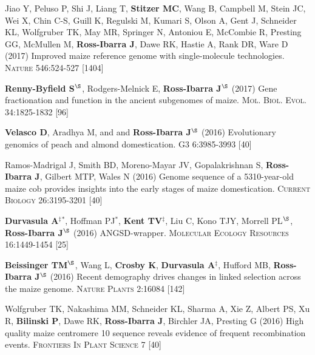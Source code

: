\documentclass[letterpaper,10pt]{article}
\begin{document}
\begin{etaremune}
\item  Jiao Y, Peluso P,  Shi J,  Liang T, {\bf Stitzer MC}, Wang B,  Campbell M, Stein JC,  Wei X,  Chin C-S,  Guill K,  Regulski M,  Kumari S,  Olson A,  Gent J, Schneider KL,  Wolfgruber TK, May MR, Springer N,  Antoniou E,  McCombie R, Presting GG,  McMullen M, {\bf Ross-Ibarra J}, Dawe RK,  Hastie A, Rank DR, Ware D (2017) Improved maize reference genome with single-molecule technologies. \textsc{Nature}  546:524-527
{} [1404]\\

\item  {\bf Renny-Byfield S}$^\S$, Rodgers-Melnick E, {\bf Ross-Ibarra J}$^\S$ (2017) Gene fractionation and function in the ancient subgenomes of maize. \textsc{Mol. Biol. Evol.} 34:1825-1832
{} [96]\\

\item {\bf Velasco D}, Aradhya M, and  and {\bf Ross-Ibarra J}$^\S$ (2016) Evolutionary genomics of peach and almond domestication. \textsc{G3} 6:3985-3993
{} [40]\\

\item Ramos-Madrigal J, Smith BD, Moreno-Mayar JV, Gopalakrishnan S, {\bf Ross-Ibarra J}, Gilbert MTP, Wales N (2016) Genome sequence of a 5310-year-old maize cob provides insights into the early stages of maize domestication. \textsc{Current Biology} 26:3195-3201
{} [40]\\

\item {\bf Durvasula A}$^\ddagger$$^*$,  Hoffman PJ$^*$, {\bf Kent TV}$^\ddagger$, Liu C, Kono TJY, Morrell PL$^\S$, {\bf Ross-Ibarra J}$^\S$ (2016) ANGSD-wrapper. \textsc{Molecular Ecology Resources} 16:1449-1454
{} [25]\\

\item {\bf Beissinger TM}$^\S$, Wang L, {\bf Crosby K}, {\bf Durvasula A}$^\ddagger$, Hufford MB, {\bf Ross-Ibarra J}$^\S$ (2016)  Recent demography drives changes in linked selection across the maize genome. \textsc{Nature Plants} 2:16084
{} [142]\\

\item Wolfgruber TK, Nakashima MM, Schneider KL, Sharma A, Xie Z, Albert PS, Xu R, {\bf Bilinski P},  Dawe RK, {\bf Ross-Ibarra J}, Birchler JA, Presting G (2016) High quality maize centromere 10 sequence reveals evidence of frequent recombination events. \textsc{Frontiers In Plant Science} 7
{} [40]\\


\end{etaremune}
\end{document}
